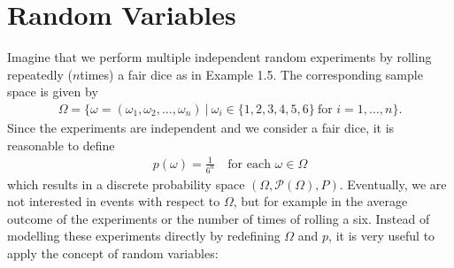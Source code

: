 \documentclass[letterpaper,10pt,english]{jupyterBook}
\begin{document}
\section{Random Variables}
\label{\detokenize{fund/fundprob:random-variables}}
\sphinxAtStartPar
Imagine that we perform multiple independent random experiments by rolling repeatedly (\(n\)\sphinxhyphen{}times) a fair dice as in Example 1.5. The corresponding sample space is given by
\begin{equation*}
\begin{split}\Omega = \{ \omega = (\omega_1, \omega_2, \dots, \omega_n)~|~\omega_i \in \{1, 2, 3, 4, 5, 6\} \ \text{for } i=1, \dots,n \}.\end{split}
\end{equation*}
\sphinxAtStartPar
Since the experiments are independent and we consider a fair dice, it is reasonable to define
\begin{equation*}
\begin{split} p(\omega) = \frac{1}{6^n} \quad \text{for each } \omega \in \Omega\end{split}
\end{equation*}
\sphinxAtStartPar
which results in a discrete probability space \((\Omega, \mathcal{P}(\Omega), P)\). Eventually, we are not interested in events with respect to \(\Omega\), but for example in the average outcome of the experiments or the number of times of rolling a six. Instead of modelling these experiments directly by redefining \(\Omega\) and \(p\), it is very useful to apply the concept of random variables:
\end{document}
